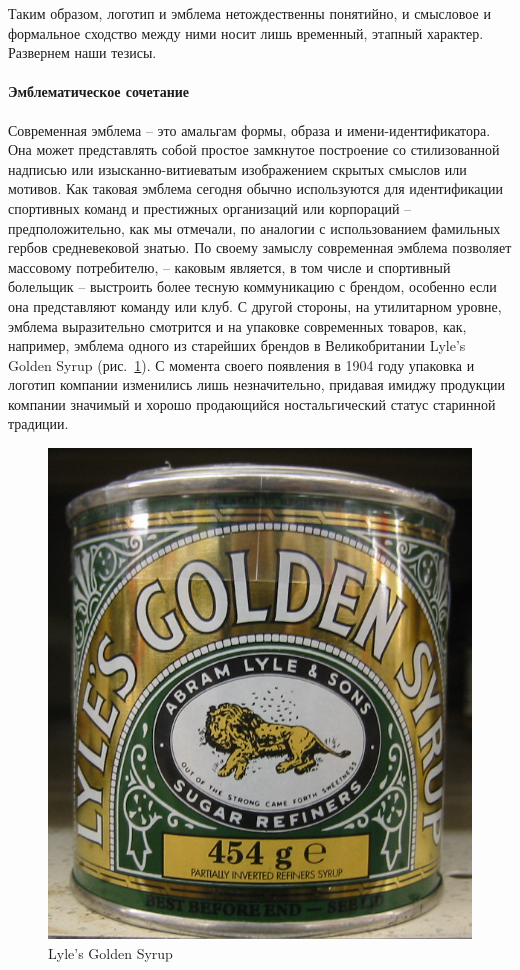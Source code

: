 Таким образом, логотип и эмблема нетождественны понятийно, и смысловое и формальное сходство между
ними носит лишь временный, этапный характер.  Развернем наши тезисы.

\paragraph{Эмблематическое сочетание}
Современная эмблема – это амальгам формы, образа и имени-идентификатора. Она может представлять
собой простое замкнутое построение со стилизованной надписью или изысканно-витиеватым изображением
скрытых смыслов или мотивов. Как таковая эмблема сегодня обычно используются для идентификации
спортивных команд и престижных организаций или корпораций – предположительно, как мы отмечали,  по
аналогии с использованием фамильных гербов средневековой знатью. По своему замыслу современная
эмблема позволяет  массовому потребителю, -- каковым является, в том числе и спортивный болельщик
-- выстроить более тесную коммуникацию с брендом, особенно если она представляют команду или клуб.
С другой стороны, на утилитарном уровне, эмблема выразительно смотрится и на упаковке современных
товаров, как, например, эмблема одного из старейших брендов в Великобритании Lyle’s Golden
Syrup (рис.~\ref{fig:syrop}). С момента своего появления в 1904 году упаковка и логотип компании изменились
лишь незначительно, придавая имиджу продукции компании значимый и хорошо продающийся ностальгический
статус старинной традиции.

\begin{figure}
  \centering
  \includegraphics[width=.5\linewidth]{images/goldensyrop}
  \caption{Lyle’s Golden Syrup}
  \label{fig:syrop}
\end{figure}

